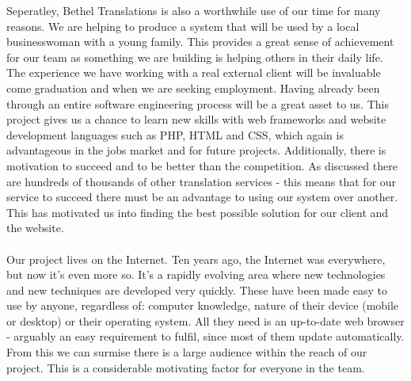 \documentclass{l3proj}
\begin{document}
Seperatley, Bethel Translations is also a worthwhile use of our time for many reasons. We are helping
to produce a system that will be used by a local businesswoman with a young family.
This provides a great sense of achievement for our team as something we are building is
helping others in their daily life. The experience we have working with a real external
client will be invaluable come graduation and when we are seeking employment. Having
already been through an entire software engineering process will be a great asset to us.
This project gives us a chance to learn new skills with web frameworks and website
development languages such as PHP, HTML and CSS, which again is advantageous in
the jobs market and for future projects.
Additionally, there is motivation to succeed and to be better than the competition.
As discussed there are hundreds of thousands of other translation services - this means
that for our service to succeed there must be an advantage to using our system over
another. This has motivated us into finding the best possible solution for our client and
the website.\\
\\
Our project lives on the Internet. Ten years ago, the Internet was everywhere,
but now it's even more so. It's a rapidly evolving area where new technologies
and new techniques are developed very quickly. These have been made easy to use
by anyone, regardless of: computer knowledge, nature of their device (mobile or
desktop) or their operating system. All they need is an up-to-date web browser -
arguably an easy requirement to fulfil, since most of them update
automatically. From this we can surmise there is a large audience within the
reach of our project. This is a considerable motivating factor for everyone in
the team.\\
\\
\end{document}
